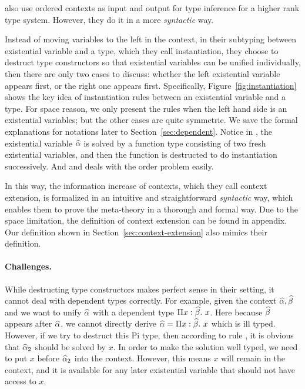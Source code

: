 \citet{dunfield2013complete} also use ordered contexts as input and output for
type inference for a higher rank type system. However, they do it in a more
\textit{syntactic} way.

Instead of moving variables to the left in the context, in their subtyping
between existential variable and a type, which they call instantiation, they
choose to destruct type constructors so that existential variables can be
unified individually, then there are only two cases to discuss: whether the left
existential variable appears first, or the right one appears first.
Specifically, Figure~\ref{fig:instantiation} shows the key idea of instantiation
rules between an existential variable and a type. For space reason, we only
present the rules when the left hand side is an existential variables; but the
other cases are quite symmetric. We save the formal explanations for notations
later to Section~\ref{sec:dependent}. Notice in , the existential
variable $\widehat{\alpha}$ is solved by a function type consisting of two fresh
existential variables, and then the function is destructed to do instantiation
successively. And  and  deals with the order
problem easily.

In this way, the information increase of contexts, which they call context
extension, is formalized in an intuitive and straightforward \textit{syntactic}
way, which enables them to prove the meta-theory in a thorough and formal way.
Due to the space limitation, the definition of context extension can be found in
appendix. Our definition shown in Section~\ref{sec:context-extension} also
mimics their definition.

\paragraph{Challenges.} While destructing type constructors makes perfect sense
in their setting, it cannot deal with dependent types correctly. For example,
given the context $\widehat{\alpha}, \widehat{\beta}$ and we want to unify $\widehat{\alpha}$ with a dependent
type $\Pi x:\widehat{\beta}.~ x$. Here because $\widehat{\beta}$ appears after $\widehat{\alpha}$, we cannot
directly derive $\widehat{\alpha} = \Pi x:\widehat{\beta}.~ x$ which is ill typed. However, if we try
to destruct this Pi type, then according to rule , it is obvious
that $\widehat{\alpha}_2$ should be solved by $x$. In order to make the solution well
typed, we need to put $x$ before $\widehat{\alpha}_2$ into the context. However, this means
$x$ will remain in the context, and it is available for any later existential
variable that should not have access to $x$.

